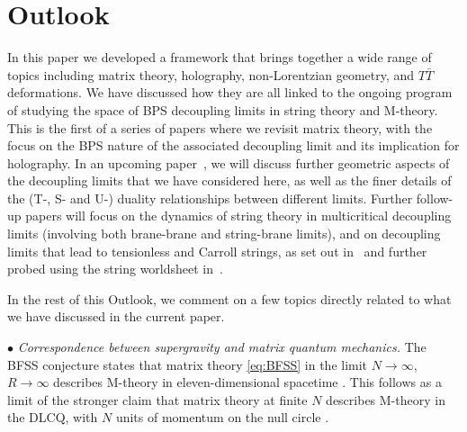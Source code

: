 \documentclass[11pt]{article}
\renewcommand{\emph}[1]{\textit{#1}}
\begin{document}
\section{Outlook} \label{sec:ol}

In this paper we developed a framework that brings together a wide range of topics including matrix theory, holography, non-Lorentzian geometry, and $T \bar T$ deformations. We have discussed how they are all linked to the ongoing program of studying the space of BPS decoupling limits in string theory and M-theory.
This is the first of a series of papers where we revisit matrix theory, with the focus on the BPS nature of the associated decoupling limit and its implication for holography. In an upcoming paper~\cite{MxReloadedII}, we will discuss further geometric aspects of the decoupling limits that we have considered here, as well as the finer details of the (T-, S- and U-) duality relationships between different limits.
Further follow-up papers will focus on the dynamics of string theory in multicritical decoupling limits (involving both brane-brane and string-brane limits), and on decoupling limits that lead to tensionless and Carroll strings, as set out in~\cite{Blair:2023noj} and further probed using the string worldsheet in~\cite{Gomis:2023eav}. 

In the rest of this Outlook, we comment on a few topics directly related to what we have discussed in the current paper. 


\vspace{3mm}
\noindent $\bullet$ \emph{Correspondence between supergravity and matrix quantum mechanics.}
The BFSS conjecture states that matrix theory \eqref{eq:BFSS} in the limit $N\rightarrow \infty$, $R \rightarrow \infty$ describes M-theory in eleven-dimensional spacetime \cite{Banks:1996vh}.
This follows as a limit of the stronger claim that matrix theory at finite $N$ describes M-theory in the DLCQ, with $N$ units of momentum on the null circle \cite{Susskind:1997cw, Seiberg:1997ad, Sen:1997we}.
\end{document}
